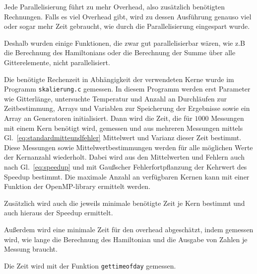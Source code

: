 	Jede Parallelisierung führt zu mehr Overhead, also zusätzlich benötigten Rechnungen. Falls es viel Overhead gibt, wird zu dessen Ausführung genauso viel oder sogar mehr Zeit gebraucht, wie durch die Parallelisierung eingespart wurde.
	
	Deshalb wurden einige Funktionen, die zwar gut parallelisierbar wären, wie z.B die Berechnung des Hamiltonians oder die Berechnung der Summe über alle Gitterelemente, nicht parallelisiert.
	
	Die benötigte Rechenzeit in Abhängigkeit der verwendeten Kerne wurde im Programm \texttt{skalierung.c} gemessen. In diesem Programm werden erst Parameter wie Gitterlänge, untersuchte Temperatur und Anzahl an Durchläufen zur Zeitbestimmung, Arrays und Variablen zur Speicherung der Ergebnisse sowie ein Array an Generatoren initialisiert. Dann wird die Zeit, die für $\num{1000}$ Messungen mit einem Kern benötigt wird, gemessen und aus mehreren Messungen mittels Gl.~\ref{eq:standardmitteundfehler} Mittelwert und Varianz dieser Zeit bestimmt. Diese Messungen sowie Mittelwertbestimmungen werden für alle möglichen Werte der Kernanzahl wiederholt. Dabei wird aus den Mittelwerten und Fehlern auch nach Gl.~\ref{eq:speedup} und mit Gaußscher Fehlerfortpflanzung der Kehrwert des Speedup bestimmt. Die maximale Anzahl an verfügbaren Kernen kann mit einer Funktion der OpenMP-library ermittelt werden. 
	
	Zusätzlich wird auch die jeweils minimale benötigte Zeit je Kern bestimmt und auch hieraus der Speedup ermittelt.
	
	Außerdem wird eine minimale Zeit für den overhead abgeschätzt, indem gemessen wird, wie lange die Berechnung des Hamiltonian und die Ausgabe von Zahlen je Messung braucht. 
	
	Die Zeit wird mit der Funktion \texttt{gettimeofday} gemessen.
	

	
